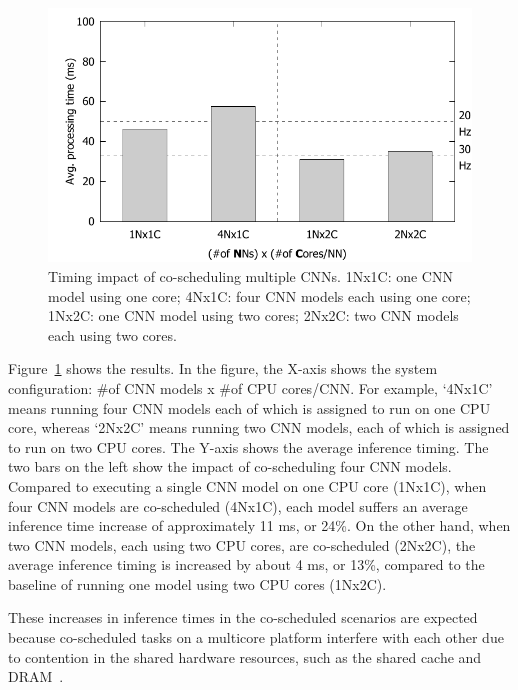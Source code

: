 \begin{figure}[h]
  \centering
  \includegraphics[width=.45\textwidth]{figs/perf_vs_modelcnt}
  \caption{Timing impact of co-scheduling multiple CNNs. 1Nx1C: one CNN
    model using one core; 4Nx1C: four CNN models each using one core;
    1Nx2C: one CNN model using two cores; 2Nx2C: two CNN models each
    using two cores.} 
  \label{fig:perf-vs-modelcnt}
\end{figure}

Figure~\ref{fig:perf-vs-modelcnt} shows the results. In the figure, the
X-axis shows the system configuration: \#of CNN models x \#of CPU
cores/CNN. For example, `4Nx1C' means running four CNN models each of
which is assigned to run on one CPU core, whereas `2Nx2C' means running
two CNN models, each of which is assigned to run on two CPU
cores. The Y-axis shows the average inference timing.
The two bars on the left show the impact of co-scheduling four CNN
models. Compared to executing a single CNN model on one CPU core
(1Nx1C), when four CNN models are co-scheduled (4Nx1C), each model
suffers an average inference time increase of approximately 11 ms,
or 24\%. On the other hand, when two CNN models, each using two CPU
cores, are co-scheduled (2Nx2C), the average inference timing is increased by
about 4 ms, or 13\%, compared to the baseline of running one model
using two CPU cores (1Nx2C). 

These increases in inference times in the co-scheduled scenarios are
expected because co-scheduled tasks on a
multicore platform interfere with each other due to contention in the
shared hardware resources, such as the shared
cache and DRAM~\cite{Gracioli2015,Yun2013}.


